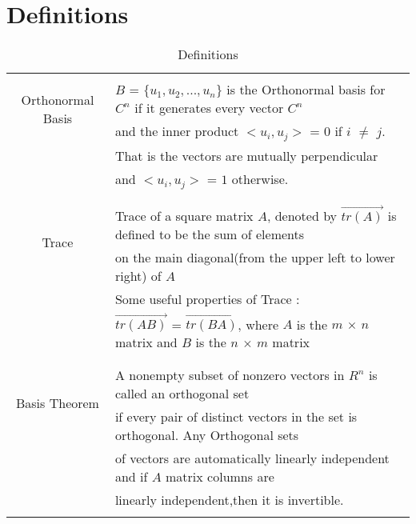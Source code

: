 \documentclass[journal,12pt]{IEEEtran}
\begin{document}
\section{\textbf{Definitions}}
\renewcommand{\thetable}{1}
\begin{table}[ht!]
\centering
\begin{tabular}{|c|l|}
    \hline
	\multirow{3}{*}{Orthonormal Basis} 
	& \\
	& $B$ = $\{u_1,u_2,...,u_n\}$ is the Orthonormal basis for $C^n$ if it generates every vector $C^n$\\
	& and the inner product $<u_i,u_j>$ = $0$ if $i$ $\ne$ $j$.\\
	& That is the vectors are mutually perpendicular\\
	& and $<u_i,u_j>$ = $1$ otherwise. \\
	&\\
	\hline
	\multirow{3}{*}{Trace} 
	&\\
	& Trace of a square matrix $A$, denoted by $\Vec{tr(A)}$ is defined to be the sum of elements\\
	& on the main diagonal(from the upper left to lower right) of $A$\\
	& Some useful properties of Trace : \\
	&  $\Vec{tr(AB)}$ =  $\Vec{tr(BA)}$, where $A$ is the $m$ $\times$ $n$ matrix and $B$ is the $n$ $\times$ $m$ matrix\\  
	&\\
	\hline
	\multirow{3}{*}{Basis Theorem} 
	&\\
	& A nonempty subset of nonzero vectors in $R^n$ is called an orthogonal set\\
	& if every pair of distinct vectors in the set is orthogonal. Any Orthogonal sets\\
	&  of vectors are automatically linearly independent and if $A$ matrix columns are\\
	& linearly independent,then it is invertible.\\
	&\\
    \hline
\end{tabular}
\label{table:1}
    \caption{Definitions}
\end{table}
\newpage
\end{document}
